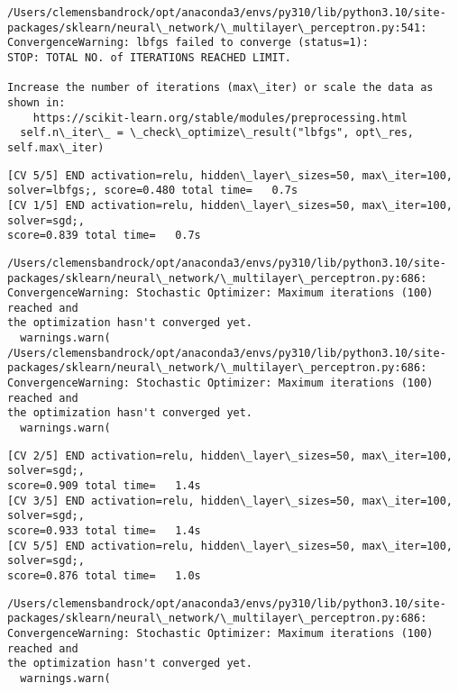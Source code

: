 \documentclass[11pt]{article}
\begin{document}
    \begin{Verbatim}[commandchars=\\\{\}]
/Users/clemensbandrock/opt/anaconda3/envs/py310/lib/python3.10/site-
packages/sklearn/neural\_network/\_multilayer\_perceptron.py:541:
ConvergenceWarning: lbfgs failed to converge (status=1):
STOP: TOTAL NO. of ITERATIONS REACHED LIMIT.

Increase the number of iterations (max\_iter) or scale the data as shown in:
    https://scikit-learn.org/stable/modules/preprocessing.html
  self.n\_iter\_ = \_check\_optimize\_result("lbfgs", opt\_res, self.max\_iter)
    \end{Verbatim}

    \begin{Verbatim}[commandchars=\\\{\}]
[CV 5/5] END activation=relu, hidden\_layer\_sizes=50, max\_iter=100,
solver=lbfgs;, score=0.480 total time=   0.7s
[CV 1/5] END activation=relu, hidden\_layer\_sizes=50, max\_iter=100, solver=sgd;,
score=0.839 total time=   0.7s
    \end{Verbatim}

    \begin{Verbatim}[commandchars=\\\{\}]
/Users/clemensbandrock/opt/anaconda3/envs/py310/lib/python3.10/site-
packages/sklearn/neural\_network/\_multilayer\_perceptron.py:686:
ConvergenceWarning: Stochastic Optimizer: Maximum iterations (100) reached and
the optimization hasn't converged yet.
  warnings.warn(
/Users/clemensbandrock/opt/anaconda3/envs/py310/lib/python3.10/site-
packages/sklearn/neural\_network/\_multilayer\_perceptron.py:686:
ConvergenceWarning: Stochastic Optimizer: Maximum iterations (100) reached and
the optimization hasn't converged yet.
  warnings.warn(
    \end{Verbatim}

    \begin{Verbatim}[commandchars=\\\{\}]
[CV 2/5] END activation=relu, hidden\_layer\_sizes=50, max\_iter=100, solver=sgd;,
score=0.909 total time=   1.4s
[CV 3/5] END activation=relu, hidden\_layer\_sizes=50, max\_iter=100, solver=sgd;,
score=0.933 total time=   1.4s
[CV 5/5] END activation=relu, hidden\_layer\_sizes=50, max\_iter=100, solver=sgd;,
score=0.876 total time=   1.0s
    \end{Verbatim}

    \begin{Verbatim}[commandchars=\\\{\}]
/Users/clemensbandrock/opt/anaconda3/envs/py310/lib/python3.10/site-
packages/sklearn/neural\_network/\_multilayer\_perceptron.py:686:
ConvergenceWarning: Stochastic Optimizer: Maximum iterations (100) reached and
the optimization hasn't converged yet.
  warnings.warn(
    \end{Verbatim}
\end{document}

